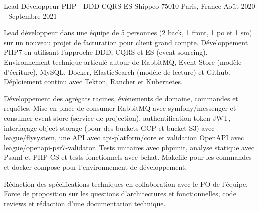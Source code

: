 \cventry
{Lead Développeur PHP - DDD CQRS ES} %
{Shippeo} %
{75010 Paris, France} %
{Août 2020 - Septembre 2021} %
{
\begin{cvitems} %
    \item
    {
        Lead développeur dans une équipe de 5 personnes (2 back, 1 front, 1 po et 1 sm) sur un nouveau projet de facturation
        pour client grand compte. Développement PHP7 en utilisant l'approche DDD, CQRS et ES (event sourcing). Environnement 
        technique articulé autour de RabbitMQ, Event Store (modèle d'écriture), MySQL, Docker, ElasticSearch (modèle de lecture) et Github. 
        Déploiement continu avec Tekton, Rancher et Kubernetes.
    }
    \item
    {
	Développement des agrégats racines, événements de domaine, commandes et requêtes. Mise en place de consumer RabbitMQ 
	avec symfony/messenger et consumer event-store (service de projection), authentification token JWT, interfaçage object 
	storage (pour des buckets GCP et bucket S3) avec league/flysystem, une API avec api-platform/core et validation OpenAPI 
	avec league/openapi-psr7-validator. Tests unitaires avec phpunit, analyse statique avec Psaml et PHP CS et tests fonctionnels avec behat. 
	Makefile pour les commandes et docker-compose pour l'environnement de développement.
    }
    \item
    {
        Rédaction des spécifications techniques en collaboration avec le PO de l'équipe. Force de proposition sur 
        les questions d’architectures et fonctionnelles, code reviews et rédaction d'une documentation technique.
    }
\end{cvitems}
}
